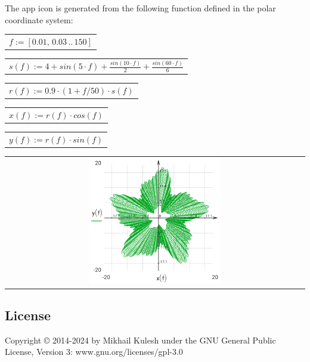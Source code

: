 \documentclass[DIV=calc, paper=a4, fontsize=11pt, twocolumn]{scrartcl}
\begin{document}
The app icon is generated from the
following function defined in the
polar coordinate system:
\begin{center}\begin{tabular}{c}
                $f := \left[ 0.01,\, 0.03 \,..\, 150 \right]$
\end{tabular}\end{center}
\begin{center}\begin{tabular}{c}
                $s(f) := 4 + sin \left( 5 \cdot f\right)  + \frac{sin \left( 10 \cdot f\right) }{2} + \frac{sin \left( 60 \cdot f\right) }{6}$
\end{tabular}\end{center}
\begin{center}\begin{tabular}{c}
                $r(f) := 0.9 \cdot \left( 1 + f / 50 \right) \cdot s \left( f\right) $
\end{tabular}\end{center}
\begin{center}\begin{tabular}{c}
                $x(f) := r \left( f\right)  \cdot cos \left( f\right) $
\end{tabular}\end{center}
\begin{center}\begin{tabular}{c}
                $y(f) := r \left( f\right)  \cdot sin \left( f\right) $
\end{tabular}\end{center}
\begin{center}\begin{tabular}{c} \includegraphics[width=0.45\textwidth]{graphics/about_micromath_fig1.png} \end{tabular}\end{center}

\subsection*{License}

Copyright © 2014-2024 by Mikhail Kulesh
under the GNU General Public License,
Version 3:
www.gnu.org/licenses/gpl-3.0
\end{document}
